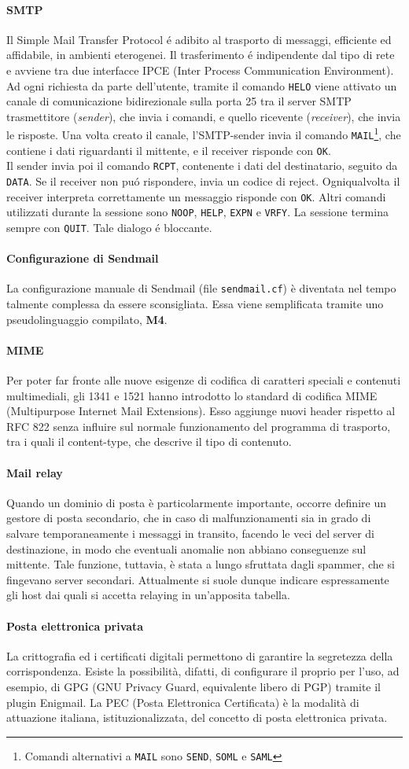 \documentclass[a4paper, twoside]{article}
\def\code#1{\texttt{#1}}
\def\para#1{\paragraph{#1}\label{#1}}
\def\vedi#1{\nameref{#1}}
\begin{document}
\para{SMTP} Il Simple Mail Transfer Protocol  \'e adibito al trasporto di messaggi, efficiente ed affidabile, in ambienti eterogenei. Il trasferimento \'e indipendente dal tipo di rete e avviene tra due interfacce IPCE (Inter Process Communication Environment). Ad ogni richiesta da parte dell'utente, tramite il comando \code{HELO} viene attivato un canale di comunicazione bidirezionale sulla porta 25 tra il server SMTP trasmettitore (\textit{sender}), che invia i comandi, e quello ricevente (\textit{receiver}), che invia le risposte.
Una volta creato il canale, l'SMTP-sender invia il comando \code{MAIL}\footnote{Comandi alternativi a \code{MAIL} sono \code{SEND}, \code{SOML} e \code{SAML}}, che contiene i dati riguardanti il mittente, e il receiver risponde con \code{OK}.\\
Il sender invia poi il comando \code{RCPT}, contenente i dati del destinatario, seguito da \code{DATA}. Se il receiver non pu\'o rispondere, invia un codice di reject. Ogniqualvolta il receiver interpreta correttamente un messaggio risponde con \code{OK}. Altri comandi utilizzati durante la sessione sono \code{NOOP}, \code{HELP}, \code{EXPN} e \code{VRFY}. La sessione termina sempre con \code{QUIT}. Tale dialogo \'e bloccante. 
\para{Configurazione di Sendmail}
La configurazione manuale di Sendmail (file \code{sendmail.cf}) è diventata nel tempo talmente complessa da essere sconsigliata. Essa viene semplificata tramite uno pseudolinguaggio compilato, \textbf{M4}.
\para{MIME}
Per poter far fronte alle nuove esigenze di codifica di caratteri speciali e contenuti multimediali, gli \vedi{RFC} 1341 e 1521 hanno introdotto lo standard di codifica MIME (Multipurpose Internet Mail Extensions). Esso aggiunge nuovi header rispetto al RFC 822 senza influire sul normale funzionamento del programma di trasporto, tra i quali il content-type, che descrive il tipo di contenuto. 
\para{Mail relay} Quando un dominio di posta è particolarmente importante, occorre definire un gestore di posta secondario, che in caso di malfunzionamenti sia in grado di salvare temporaneamente i messaggi in transito, facendo le veci del server di destinazione, in modo che eventuali anomalie non abbiano conseguenze sul mittente.
Tale funzione, tuttavia, è stata a lungo sfruttata dagli spammer, che si fingevano server secondari. Attualmente si suole dunque indicare espressamente gli host dai quali si accetta relaying in un'apposita tabella.
\para{Posta elettronica privata}
La crittografia ed i certificati digitali permettono di garantire la segretezza della corrispondenza. Esiste la possibilità, difatti, di configurare il proprio \vedi{MUA} per l'uso, ad esempio, di GPG (GNU Privacy Guard, equivalente libero di PGP) tramite il plugin Enigmail. La PEC (Posta Elettronica Certificata) è la modalità di attuazione italiana, istituzionalizzata, del concetto di posta elettronica privata.
\end{document}
